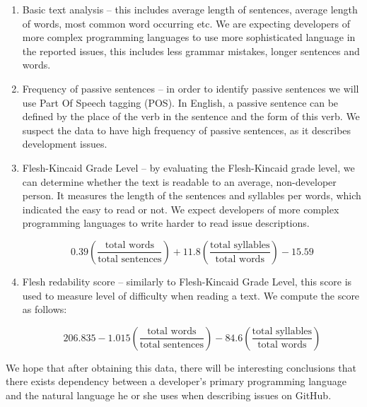 \documentclass[]{article}
\begin{document}
\begin{enumerate}
	\item Basic text analysis -- this includes average length of sentences, average length of words, most common word occurring etc. We are expecting developers of more complex programming languages to use more sophisticated language in the reported issues, this includes less grammar mistakes, longer sentences and words.

	\item Frequency of passive sentences -- in order to identify passive sentences we will use Part Of Speech tagging (POS). In English, a passive sentence can be defined by the place of the verb in the sentence and the form of this verb. We suspect the data to have high frequency of passive sentences, as it describes development issues.

	\item Flesh-Kincaid Grade Level -- by evaluating the Flesh-Kincaid grade level, we can determine whether the text is readable to an average, non-developer person. It measures the length of the sentences and syllables per words, which indicated the easy to read or not. We expect developers of more complex programming languages to write harder to read issue descriptions.

	      \[0.39\left(\frac{\text{total words}}{\text{total sentences}}\right) + 11.8\left(\frac{\text{total syllables}}{\text{total words}}\right) - 15.59\]

	\item Flesh redability score -- similarly to Flesh-Kincaid Grade Level, this score is used to measure level of difficulty when reading a text. We compute the score as follows:

	      \[206.835 - 1.015\left(\frac{\text{total words}}{\text{total sentences}}\right) - 84.6\left(\frac{\text{total syllables}}{\text{total words}}\right)\]
\end{enumerate}

We hope that after obtaining this data, there will be interesting conclusions that there exists dependency between a developer's primary programming language and the natural language he or she uses when describing issues on GitHub.


\end{document}
